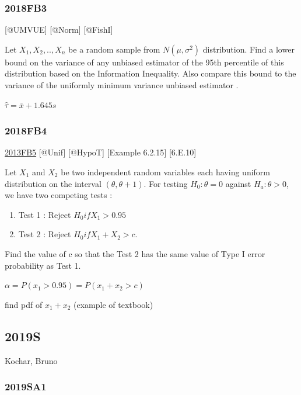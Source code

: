 \documentclass[6pt,twocolumn,Portrait]{article}
\begin{document}
\hypertarget{fb3-4}{%
\subsubsection{2018FB3}\label{fb3-4}}

{[}@UMVUE{]} {[}@Norm{]} {[}@FishI{]}

Let \(X_1,X_2,..,X_n\) be a random sample from \(N(\mu,\sigma^2)\)
distribution. Find a lower bound on the variance of any unbiased
estimator of the 95th percentile of this distribution based on the
Information Inequality. Also compare this bound to the variance of the
uniformly minimum variance unbiased estimator .

\(\hat\tau=\bar x+1.645s\)

\hypertarget{fb4-4}{%
\subsubsection{2018FB4}\label{fb4-4}}

\protect\hyperlink{fb5}{2013FB5} {[}@Unif{]} {[}@HypoT{]} {[}Example
6.2.15{]} {[}6.E.10{]}

Let \(X_1\) and \(X_2\) be two independent random variables each having
uniform distribution on the interval \((\theta,\theta+1)\). For testing
\(H_0:\theta=0\) against \(H_a:\theta> 0\), we have two competing tests
:

\begin{enumerate}
\def\labelenumi{\arabic{enumi}.}
\item
  Test 1 : Reject \(H_0 if X_1>0.95\)
\item
  Test 2 : Reject \(H_0 if X_1+X_2>c\).
\end{enumerate}

Find the value of c so that the Test 2 has the same value of Type I
error probability as Test 1.

\(\alpha=P(x_1>0.95)=P(x_1+x_2>c)\)

find pdf of \(x_1+x_2\) (example of textbook)

\hypertarget{s-12}{%
\subsection{2019S}\label{s-12}}

Kochar, Bruno

\hypertarget{sa1-3}{%
\subsubsection{2019SA1}\label{sa1-3}}
\end{document}
